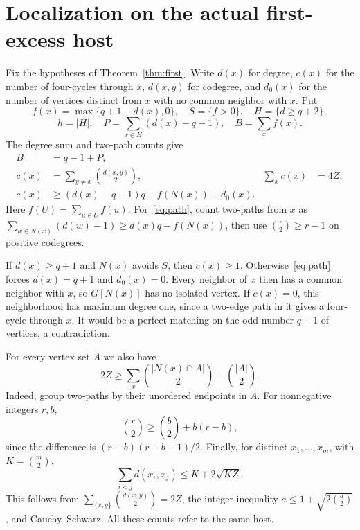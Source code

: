 \documentclass[11pt]{article}
\theoremstyle{remark}\newtheorem*{remark}{Remark}
\begin{document}
\section{Localization on the actual first-excess host}\label{sec:local}
Fix the hypotheses of Theorem~\ref{thm:first}. Write $d(x)$ for degree, $c(x)$ for the number of four-cycles through $x$, $d(x,y)$ for codegree, and $d_0(x)$ for the number of vertices distinct from $x$ with no common neighbor with $x$. Put
\[
 f(x)=\max\{q+1-d(x),0\},\quad S=\{f>0\},\quad H=\{d\geq q+2\},
\]
\[
 h=|H|,\quad P=\sum_{x\in H}(d(x)-q-1),\quad B=\sum_x f(x).
\]
The degree sum and two-path counts give
\begin{align}
 B&=q-1+P,\label{eq:deficit}\\
 c(x)&=\sum_{y\ne x}\binom{d(x,y)}2,
 &\sum_xc(x)&=4Z,\label{eq:cycles}\\
 c(x)&\geq(d(x)-q-1)q-f(N(x))+d_0(x).\label{eq:path}
\end{align}
Here $f(U)=\sum_{u\in U}f(u)$. For~\eqref{eq:path}, count two-paths from $x$ as $\sum_{w\in N(x)}(d(w)-1)\geq d(x)q-f(N(x))$, then use $\binom r2\geq r-1$ on positive codegrees.

If $d(x)\geq q+1$ and $N(x)$ avoids $S$, then $c(x)\geq1$. Otherwise~\eqref{eq:path} forces $d(x)=q+1$ and $d_0(x)=0$. Every neighbor of $x$ then has a common neighbor with $x$, so $G[N(x)]$ has no isolated vertex. If $c(x)=0$, this neighborhood has maximum degree one, since a two-edge path in it gives a four-cycle through $x$. It would be a perfect matching on the odd number $q+1$ of vertices, a contradiction.

For every vertex set $A$ we also have
\begin{equation}\label{eq:subset}
 2Z\geq\sum_x\binom{|N(x)\cap A|}{2}-\binom{|A|}{2}.
\end{equation}
Indeed, group two-paths by their unordered endpoints in $A$. For nonnegative integers $r,b$,
\begin{equation}\label{eq:convex}
 \binom r2\geq\binom b2+b(r-b),
\end{equation}
since the difference is $(r-b)(r-b-1)/2$. Finally, for distinct $x_1,\ldots,x_m$, with $K=\binom m2$,
\begin{equation}\label{eq:overlap}
 \sum_{i<j}d(x_i,x_j)\leq K+2\sqrt{KZ}.
\end{equation}
This follows from $\sum_{\{x,y\}}\binom{d(x,y)}2=2Z$, the integer inequality $a\leq1+\sqrt{2\binom a2}$, and Cauchy--Schwarz. All these counts refer to the same host.
\end{document}
